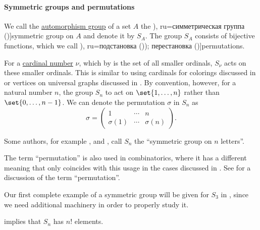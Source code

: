 \paragraph{Symmetric groups and permutations}

\begin{definition}\label{def:symmetric_group}
  We call the \hyperref[def:automorphism_group]{automorphism group} of a set \( A \) the \term[bg=симетрична група (\cite[376]{Обрешков1962ВисшаАлгебра}), ru=симметрическая группа (\cite[154]{Винберг2014КурсАлгебры})]{symmetric group} on \( A \) and denote it by \( S_A \). The group \( S_A \) consists of bijective functions, which we call \term[bg=субституция (\cite[80]{ГеновМиховскиМоллов1991Алгебра}), ru=подстановка (\cite[154]{Винберг2014КурсАлгебры})); перестановка (\cite[sec. 4.2]{Тыртышников2007ЛинейнаяАлгебра})]{permutations}.

  For a \hyperref[def:cardinal]{cardinal number} \( \nu \), which by  is the set of all smaller ordinals, \( S_\nu \) acts on these smaller ordinals. This is similar to using cardinals for colorings discussed in  or vertices on universal graphs discussed in . By convention, however, for a natural number \( n \), the group \( S_n \) to act on \( \set{ 1, \ldots, n } \) rather than \( \set{ 0, \ldots, n - 1 } \). We can denote the permutation \( \sigma \) in \( S_n \) as
  \begin{equation*}
    \sigma
    =
    \begin{pmatrix}
      1         & \cdots & n \\
      \sigma(1) & \cdots & \sigma(n)
    \end{pmatrix}.
  \end{equation*}
\end{definition}
\begin{comments}
  \item Some authors, for example ,  and , call \( S_n \) the \enquote{symmetric group on \( n \) letters}.

  \item The term \enquote{permutation} is also used in combinatorics, where it has a different meaning that only coincides with this usage in the cases discussed in . See  for a discussion of the term \enquote{permutation}.

  \item Our first complete example of a symmetric group will be given for \( S_3 \) in , since we need additional machinery in order to properly study it.

  \item {} implies that \( S_n \) has \( n! \) elements.
\end{comments}

